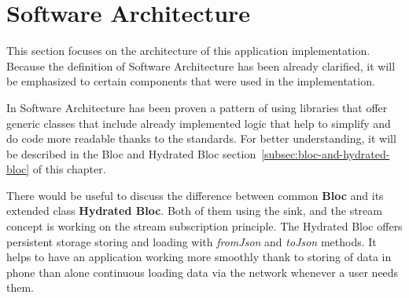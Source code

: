 \section{Software Architecture}\label{sec:software-architecture}
This section focuses on the architecture of this application implementation.
Because the definition of Software Architecture has been already clarified, it will be emphasized to certain components that were used in the implementation.

In Software Architecture has been proven a pattern of using libraries that offer generic classes that include already implemented logic that help to simplify and do code more readable thanks to the standards.
For better understanding, it will be described in the Bloc and Hydrated Bloc section~\ref{subsec:bloc-and-hydrated-bloc} of this chapter.

There would be useful to discuss the difference between common \textbf{Bloc} and its extended class \textbf{Hydrated Bloc}.
Both of them using the sink, and the stream concept is working on the stream subscription principle.
The Hydrated Bloc offers persistent storage storing and loading with \textit{fromJson} and \textit{toJson} methods.
It helps to have an application working more smoothly thank to storing of data in phone than alone continuous loading data via the network whenever a user needs them.









